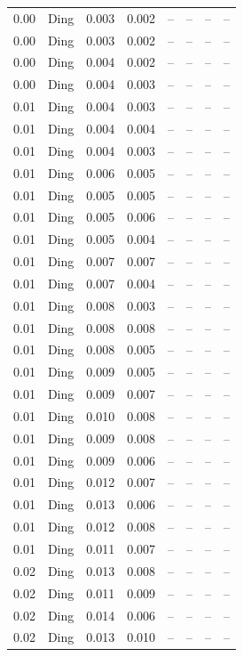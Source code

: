 \begin{table}[H]
\begin{tabular}{l c l l l}
0.00 & Ding & 0.003 & 0.002 & -- & -- & -- & -- \\
0.00 & Ding & 0.003 & 0.002 & -- & -- & -- & -- \\
0.00 & Ding & 0.004 & 0.002 & -- & -- & -- & -- \\
0.00 & Ding & 0.004 & 0.003 & -- & -- & -- & -- \\
0.01 & Ding & 0.004 & 0.003 & -- & -- & -- & -- \\
0.01 & Ding & 0.004 & 0.004 & -- & -- & -- & -- \\
0.01 & Ding & 0.004 & 0.003 & -- & -- & -- & -- \\
0.01 & Ding & 0.006 & 0.005 & -- & -- & -- & -- \\
0.01 & Ding & 0.005 & 0.005 & -- & -- & -- & -- \\
0.01 & Ding & 0.005 & 0.006 & -- & -- & -- & -- \\
0.01 & Ding & 0.005 & 0.004 & -- & -- & -- & -- \\
0.01 & Ding & 0.007 & 0.007 & -- & -- & -- & -- \\
0.01 & Ding & 0.007 & 0.004 & -- & -- & -- & -- \\
0.01 & Ding & 0.008 & 0.003 & -- & -- & -- & -- \\
0.01 & Ding & 0.008 & 0.008 & -- & -- & -- & -- \\
0.01 & Ding & 0.008 & 0.005 & -- & -- & -- & -- \\
0.01 & Ding & 0.009 & 0.005 & -- & -- & -- & -- \\
0.01 & Ding & 0.009 & 0.007 & -- & -- & -- & -- \\
0.01 & Ding & 0.010 & 0.008 & -- & -- & -- & -- \\
0.01 & Ding & 0.009 & 0.008 & -- & -- & -- & -- \\
0.01 & Ding & 0.009 & 0.006 & -- & -- & -- & -- \\
0.01 & Ding & 0.012 & 0.007 & -- & -- & -- & -- \\
0.01 & Ding & 0.013 & 0.006 & -- & -- & -- & -- \\
0.01 & Ding & 0.012 & 0.008 & -- & -- & -- & -- \\
0.01 & Ding & 0.011 & 0.007 & -- & -- & -- & -- \\
0.02 & Ding & 0.013 & 0.008 & -- & -- & -- & -- \\
0.02 & Ding & 0.011 & 0.009 & -- & -- & -- & -- \\
0.02 & Ding & 0.014 & 0.006 & -- & -- & -- & -- \\
0.02 & Ding & 0.013 & 0.010 & -- & -- & -- & -- \\

\end{tabular}
\end{table}

